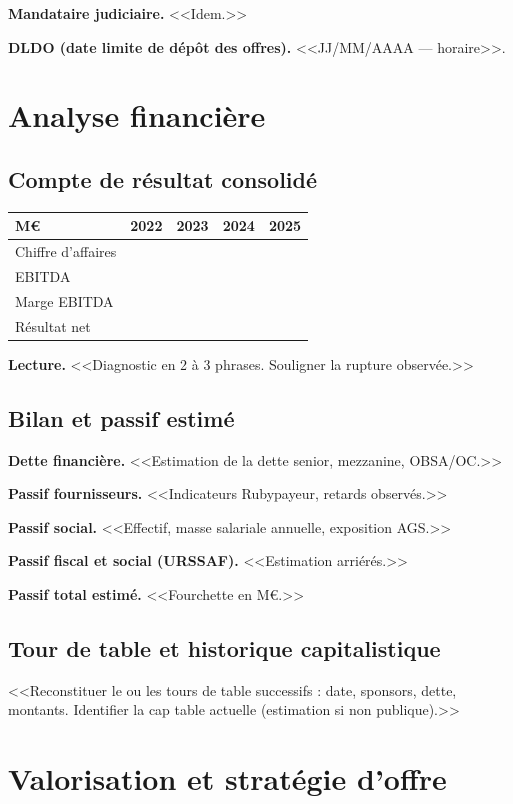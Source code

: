 \documentclass[11pt,a4paper]{article}
\begin{document}
\textbf{Mandataire judiciaire.} <<Idem.>>

\textbf{DLDO (date limite de dépôt des offres).} <<JJ/MM/AAAA --- horaire>>.

\section{Analyse financière}

\subsection{Compte de résultat consolidé}

\begin{tabular}{lrrrr}
\toprule
M\euro{} & 2022 & 2023 & 2024 & 2025 \\
\midrule
Chiffre d'affaires & & & & \\
EBITDA & & & & \\
Marge EBITDA & & & & \\
Résultat net & & & & \\
\bottomrule
\end{tabular}

\textbf{Lecture.} <<Diagnostic en 2 à 3 phrases. Souligner la rupture observée.>>

\subsection{Bilan et passif estimé}

\textbf{Dette financière.} <<Estimation de la dette senior, mezzanine, OBSA/OC.>>

\textbf{Passif fournisseurs.} <<Indicateurs Rubypayeur, retards observés.>>

\textbf{Passif social.} <<Effectif, masse salariale annuelle, exposition AGS.>>

\textbf{Passif fiscal et social (URSSAF).} <<Estimation arriérés.>>

\textbf{Passif total estimé.} <<Fourchette en M\euro{}.>>

\subsection{Tour de table et historique capitalistique}

<<Reconstituer le ou les tours de table successifs : date, sponsors, dette,
montants. Identifier la cap table actuelle (estimation si non publique).>>

\section{Valorisation et stratégie d'offre}
\end{document}
